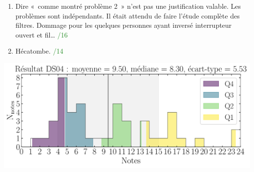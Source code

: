 \documentclass[a4paper, 10pt, final, garamond]{book}
\begin{document}
\begin{enumerate}
    \item Dire «~comme montré problème 2~» n'est pas une justification valable.
        Les problèmes sont indépendants. Il était attendu de faire l'étude
        complète des filtres. Dommage pour les quelques personnes ayant inversé
        interrupteur ouvert et fil… \hfill \textcolor{ForestGreen}{/16}
    \item Hécatombe. \hfill \textcolor{ForestGreen}{/14}
\end{enumerate}

\vfill

\begin{center}
    \includegraphics[width=.72\linewidth]{res_DS04.pdf}
\end{center}

\vfill
\end{document}
